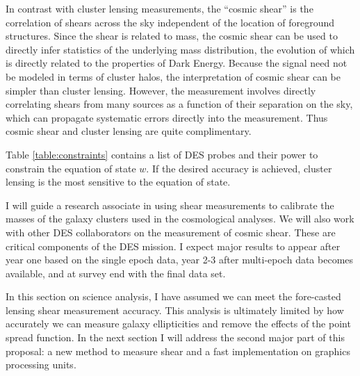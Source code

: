 \documentclass[12pt]{article}
\begin{document}
In contrast with cluster lensing measurements, the ``cosmic shear'' is the
correlation of shears across the sky independent of the location of foreground
structures.  Since the shear is related to mass, the cosmic shear can be used
to directly infer statistics of the underlying mass distribution, the evolution
of which is directly related to the properties of Dark Energy.  Because the
signal need not be modeled in terms of cluster halos, the interpretation of
cosmic shear can be simpler than cluster lensing.  However, the measurement
involves directly correlating shears from many sources as a function of their
separation on the sky, which can propagate systematic errors directly into the
measurement. Thus cosmic shear and cluster lensing are quite complimentary.

Table \ref{table:constraints} contains a list of DES probes and their power to
constrain the equation of state $w$.  If the desired accuracy is achieved,
cluster lensing is the most sensitive to the equation of state.

I will guide a research associate in using shear measurements to calibrate the
masses of the galaxy clusters used in the cosmological analyses.  We will also
work with other DES collaborators on the measurement of cosmic shear.  These
are critical components of the DES mission.   I expect major results to appear
after year one based on the single epoch data, year 2-3 after multi-epoch data
becomes available, and at survey end with the final data set.

In this section on science analysis, I have assumed we can meet the fore-casted
lensing shear measurement accuracy.  This analysis is ultimately limited by how
accurately we can measure galaxy ellipticities and remove the effects of the
point spread function.  In the next section I will address the second major
part of this proposal: a new method to measure shear and a fast implementation
on graphics processing units.

\end{document}
